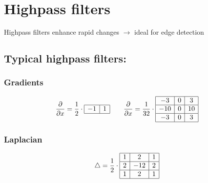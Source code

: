 \documentclass[letterpaper,10pt,english]{sphinxmanual}
\begin{document}
\section{High\sphinxhyphen{}pass filters}
\label{\detokenize{02-ImageEnhancement:id1}}
\sphinxAtStartPar
High\sphinxhyphen{}pass filters enhance rapid changes \(\rightarrow\) ideal for edge detection


\subsection{Typical high\sphinxhyphen{}pass filters:}
\label{\detokenize{02-ImageEnhancement:typical-high-pass-filters}}

\subsubsection{Gradients}
\label{\detokenize{02-ImageEnhancement:gradients}}\begin{equation*}
\begin{split}\frac{\partial}{\partial x}=\frac{1}{2}\cdot\begin{array}{|c|c|}
\hline
-1 & 1\\
\hline
\end{array}\qquad
\frac{\partial}{\partial x}=\frac{1}{32}\cdot\begin{array}{|c|c|c|}
\hline
-3 & 0 & 3\\
\hline
-10 & 0 & 10\\
\hline
-3 & 0 & 3\\
\hline
\end{array}
\end{split}
\end{equation*}

\subsubsection{Laplacian}
\label{\detokenize{02-ImageEnhancement:laplacian}}\begin{equation*}
\begin{split}
\bigtriangleup=\frac{1}{2}\cdot\begin{array}{|c|c|c|}
\hline
1 & 2 & 1\\
\hline
2 & -12 & 2\\
\hline
1 & 2 & 1\\
\hline
\end{array}
\end{split}
\end{equation*}
\end{document}
